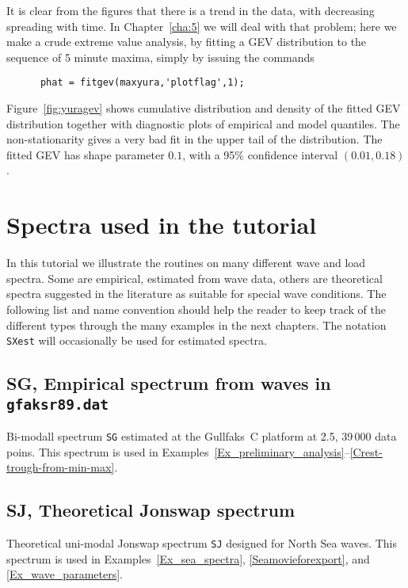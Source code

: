 {It is clear from the figures that there is a trend in the data, with
decreasing spreading with time. In Chapter~\ref{cha:5} we will deal with
that problem; here we make a crude extreme value analysis, by fitting a
GEV distribution to the sequence of 5 minute maxima,
simply by issuing the commands
{\small \begin{verbatim}
      phat = fitgev(maxyura,'plotflag',1);
\end{verbatim}}

Figure~\ref{fig:yuragev}  shows cumulative distribution
and density of the fitted GEV distribution together with diagnostic
plots of empirical and model quantiles. The non-stationarity
gives a very bad fit in the upper tail of the distribution. The fitted GEV
has shape parameter $0.1$, with a 95\% confidence interval $(0.01, 0.18)$.


\section{Spectra used in the tutorial}\label{s:ListOfSpectra}
In this tutorial we illustrate the routines on many different wave and load spectra. 
Some are empirical, estimated from wave data, others are theoretical spectra 
suggested in the literature as suitable for special wave conditions. The following 
list and name convention 
should help the reader to keep track of the different types through the 
many examples in the next chapters.   The notation {\tt SXest} will occasionally be used 
for estimated spectra. 

\subsection{SG, Empirical spectrum from waves in {\tt gfaksr89.dat}}
Bi-modall spectrum {\tt SG} estimated at the Gullfaks~C platform at 2.5\:[Hz], 39\,000 data poins. 
This spectrum is used in Examples~\ref{Ex_preliminary_analysis}--\ref{Crest-trough-from-min-max}. 

\subsection{SJ, Theoretical {\sc Jonswap} spectrum}
Theoretical uni-modal {\sc Jonswap} spectrum {\tt SJ} designed for North Sea waves. 
This spectrum is used in Examples~\ref{Ex_sea_spectra}, \ref{Seamovieforexport}, and \ref{Ex_wave_parameters}.

}
